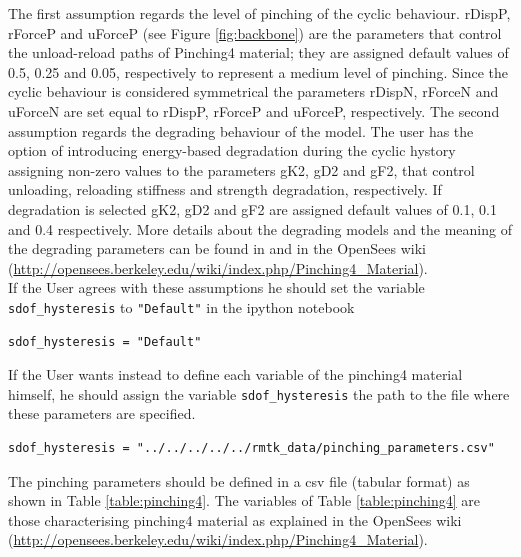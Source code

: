 The first assumption regards the level of pinching of the cyclic behaviour. rDispP, rForceP and uForceP (see Figure \ref{fig:backbone}) are the parameters that control the unload-reload paths of Pinching4 material; they are assigned default values of 0.5, 0.25 and 0.05, respectively to represent a medium level of pinching. Since the cyclic behaviour is considered symmetrical the parameters rDispN, rForceN and uForceN are set equal to rDispP, rForceP and uForceP, respectively.
The second assumption regards the degrading behaviour of the model. The user has the option of introducing energy-based degradation during the cyclic hystory assigning non-zero values to the parameters gK2, gD2 and gF2, that control unloading, reloading stiffness and strength degradation, respectively. If degradation is selected gK2, gD2 and gF2 are assigned default values of 0.1, 0.1 and 0.4 respectively. More details about the degrading models and the meaning of the degrading parameters can be found in \citep{LowesEtAl2003}  and in the OpenSees wiki (\href{http://opensees.berkeley.edu/wiki/index.php/Pinching4_Material}{http://opensees.berkeley.edu/wiki/index.php/Pinching4\_Material}).\\

If the User agrees with these assumptions he should set the variable \verb=sdof_hysteresis= to \verb="Default"= in the ipython notebook

\begin{Verbatim}[frame=single, commandchars=\\\{\}, samepage=true]
sdof_hysteresis = "Default"
\end{Verbatim}

If the User wants instead to define each variable of the pinching4 material himself, he should assign the variable \verb=sdof_hysteresis= the path to the file where these parameters are specified.

\begin{Verbatim}[frame=single, commandchars=\\\{\}, samepage=true]
sdof_hysteresis = "../../../../../rmtk_data/pinching_parameters.csv"
\end{Verbatim}

The pinching parameters should be defined in a csv file (tabular format) as shown in Table \ref{table:pinching4}. The variables of Table \ref{table:pinching4} are those characterising pinching4 material as explained in the OpenSees wiki (\href{http://opensees.berkeley.edu/wiki/index.php/Pinching4_Material}{http://opensees.berkeley.edu/wiki/index.php/Pinching4\_Material}).


